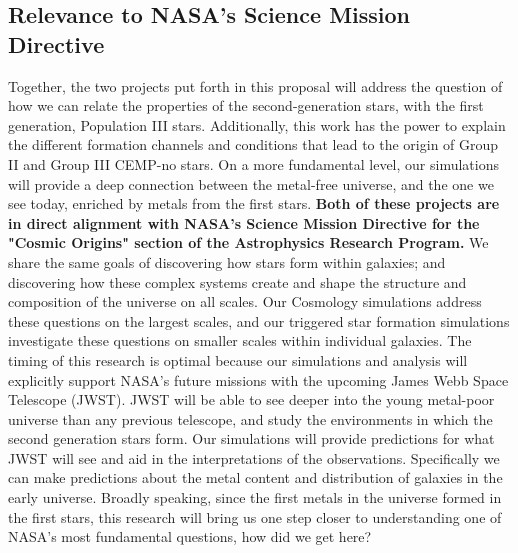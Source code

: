 \documentclass[a4paper, 12pt]{article}
\begin{document}
\subsection{Relevance to NASA's Science Mission Directive}
Together, the two projects put forth in this proposal will address the question of how we can relate the properties of the second-generation stars, with the first generation, Population III stars. Additionally, this work has the power to explain the different formation channels and conditions that lead to the origin of Group II and Group III CEMP-no stars. On a more fundamental level, our simulations will provide a deep connection between the metal-free universe, and the one we see today, enriched by metals from the first stars. \textbf{Both of these projects are in direct alignment with NASA's Science Mission Directive for the "Cosmic Origins" section of the Astrophysics Research Program.} We share the same goals of discovering how stars form within galaxies; and discovering how these complex systems create and shape the structure and composition of the universe on all scales. Our Cosmology simulations address these questions on the largest scales, and our triggered star formation simulations investigate these questions on smaller scales within individual galaxies. The timing of this research is optimal because our simulations and analysis will explicitly support NASA's future missions with the upcoming James Webb Space Telescope (JWST). JWST will be able to see deeper into the young metal-poor universe than any previous telescope, and study the environments in which the second generation stars form. Our simulations will provide predictions for what JWST will see and aid in the interpretations of the observations. Specifically we can make predictions about the metal content and distribution of galaxies in the early universe. Broadly speaking, since the first metals in the universe formed in the first stars, this research will bring us one step closer to understanding one of NASA's most fundamental questions, how did we get here?


\end{document}
